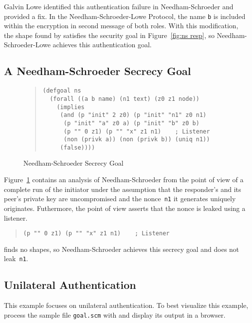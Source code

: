 \documentclass[12pt]{article}
\begin{document}
Galvin Lowe identified this authentication failure in
Needham-Schroeder and provided a fix.  In the Needham-Schroeder-Lowe
Protocol, the name \texttt{b} is included within the encryption in second
message of both roles.  With this modification, the shape found by
{\cpsa} satisfies the security goal in Figure~\ref{fig:ns resp}, so
Needham-Schroeder-Lowe achieves this authentication goal.

\subsection{A Needham-Schroeder Secrecy Goal}\label{sec:secrecy goal}

\begin{figure}
\begin{quote}
\begin{verbatim}
(defgoal ns
  (forall ((a b name) (n1 text) (z0 z1 node))
    (implies
     (and (p "init" 2 z0) (p "init" "n1" z0 n1)
      (p "init" "a" z0 a) (p "init" "b" z0 b)
      (p "" 0 z1) (p "" "x" z1 n1)    ; Listener
      (non (privk a)) (non (privk b)) (uniq n1))
     (false))))
\end{verbatim}
\end{quote}
\caption{Needham-Schroeder Secrecy Goal}\label{fig:ns secrecy}
\end{figure}

Figure~\ref{fig:ns secrecy} contains an analysis of Needham-Schroeder
from the point of view of a complete run of the initiator under the
assumption that the responder's and its peer's private key are
uncompromised and the nonce~\texttt{n1} it generates uniquely
originates.  Futhermore, the point of view asserts that the nonce is
leaked using a listener.
\begin{quote}
\begin{verbatim}
(p "" 0 z1) (p "" "x" z1 n1)    ; Listener
\end{verbatim}
\end{quote}

{\cpsa} finds no shapes, so Needham-Schroeder achieves this secrecy
goal and does not leak~\texttt{n1}.

\subsection{Unilateral Authentication}\label{sec:unilateral}

This example focuses on unilateral authentication.  To best visualize
this example, process the sample file \texttt{goal.scm} with {\cpsa}
and display its output in a browser.
\end{document}
